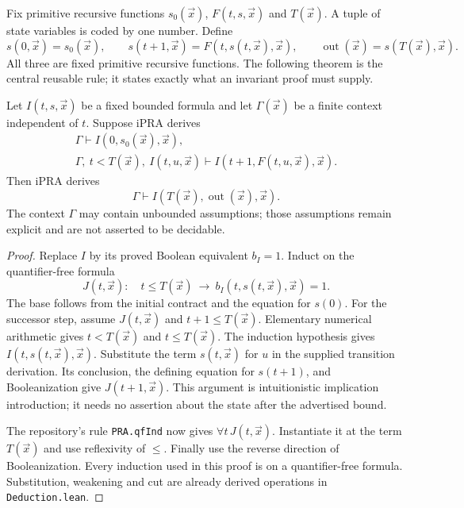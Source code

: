 Fix primitive recursive functions $s_0(\vec x)$, $F(t,s,\vec x)$ and
$T(\vec x)$.  A tuple of state variables is coded by one number.  Define
\[
 s(0,\vec x)=s_0(\vec x),\qquad
 s(t+1,\vec x)=F(t,s(t,\vec x),\vec x),\qquad
 \operatorname{out}(\vec x)=s(T(\vec x),\vec x).
\]
All three are fixed primitive recursive functions.  The following theorem is
the central reusable rule; it states exactly what an invariant proof must
supply.

\begin{theorem}
\label{logic:boundedloop}
Let $I(t,s,\vec x)$ be a fixed bounded formula and let $\Gamma(\vec x)$ be a
finite context independent of $t$.  Suppose iPRA derives
\[
\begin{gathered}
 \Gamma\vdash I(0,s_0(\vec x),\vec x),\\
 \Gamma,\ t<T(\vec x),\ I(t,u,\vec x)
       \vdash I(t+1,F(t,u,\vec x),\vec x).
\end{gathered}
\]
Then iPRA derives
\[
             \Gamma\vdash
             I(T(\vec x),\operatorname{out}(\vec x),\vec x).
\]
The context $\Gamma$ may contain unbounded assumptions; those assumptions
remain explicit and are not asserted to be decidable.
\end{theorem}

\begin{proof}
Replace $I$ by its proved Boolean equivalent $b_I=1$.  Induct on the
quantifier-free formula
\[
 J(t,\vec x):\quad
 t\le T(\vec x)\ \longrightarrow\ b_I(t,s(t,\vec x),\vec x)=1.
\]
The base follows from the initial contract and the equation for $s(0)$.
For the successor step, assume $J(t,\vec x)$ and $t+1\le T(\vec x)$.
Elementary numerical arithmetic gives $t<T(\vec x)$ and $t\le T(\vec x)$.
The induction hypothesis gives $I(t,s(t,\vec x),\vec x)$.  Substitute the
term $s(t,\vec x)$ for $u$ in the supplied transition derivation.  Its
conclusion, the defining equation for $s(t+1)$, and Booleanization give
$J(t+1,\vec x)$.  This argument is intuitionistic implication introduction;
it needs no assertion about the state after the advertised bound.

The repository's rule \texttt{PRA.qfInd} now gives $\forall t\,J(t,\vec x)$.
Instantiate it at the term $T(\vec x)$ and use reflexivity of $\le$.
Finally use the reverse direction of Booleanization.  Every induction used
in this proof is on a quantifier-free formula.  Substitution, weakening and
cut are already derived operations in \texttt{Deduction.lean}.
\end{proof}

